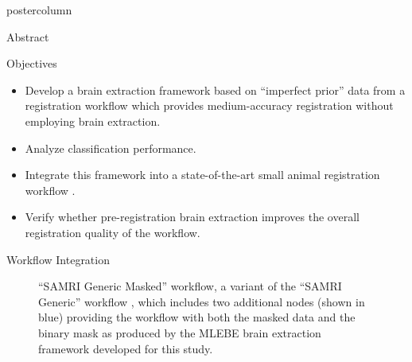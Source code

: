     \begin{frame}
        \vspace{2cm}
        \begin{columns}
            \begin{column}{.42\textwidth}
                \begin{beamercolorbox}[center]{postercolumn}
                    \begin{minipage}{.98\textwidth}  %
                        \parbox[t][\columnheight]{\textwidth}{ %
                            \begin{myblock}{Abstract}
                                
                            \end{myblock}\vfill

                            \begin{myblock}{Objectives}
                                \begin{itemize}
                                    \item Develop a brain extraction framework based on “imperfect prior” data from a registration workflow which provides medium-accuracy registration without employing brain extraction.
                                    \item Analyze classification performance.
                                    \item Integrate this framework into a state-of-the-art small animal registration workflow \cite{irsabi}.
                                    \item Verify whether pre-registration brain extraction improves the overall registration quality of the workflow.
                                \end{itemize}
                            \end{myblock}

                            \begin{myblock}{Workflow Integration}
                                \vspace{-1.6em}
                                \begin{figure}
                                    \centering
                                    \vspace{-2.9em}
                                    \caption{
                                        “SAMRI Generic Masked” workflow, a variant of the “SAMRI Generic” workflow \cite{irsabi}, which includes two additional nodes (shown in blue) providing the workflow with both the masked data and the binary mask as produced by the \textcolor{lg}{MLEBE} \cite{mlebe} brain extraction framework developed for this study.
                                    }
                                    \label{masked_worklfow_graph}
                                \end{figure}


\end{myblock}}
\end{minipage}
\end{beamercolorbox}
\end{column}
\end{columns}
\end{frame}
